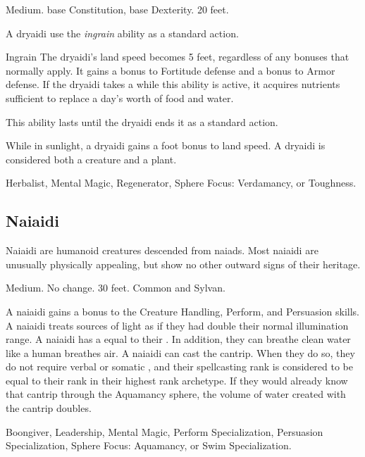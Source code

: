          Medium.
          base Constitution,  base Dexterity.
         20 feet.
        \begin{itemize}
             A dryaidi use the \textit{ingrain} ability as a standard action.
                \begin{freeability}{Ingrain}
                    The dryaidi's land speed becomes 5 feet, regardless of any bonuses that normally apply.
                    It gains a  bonus to Fortitude defense and a  bonus to Armor defense.
                    If the dryaidi takes a  while this ability is active, it acquires nutrients sufficient to replace a day's worth of food and water.

                    This ability lasts until the dryaidi ends it as a standard action.
                \end{freeability}
             While in sunlight, a dryaidi gains a  foot bonus to land speed.
             A dryaidi is considered both a creature and a plant.
        \end{itemize}
         Herbalist, Mental Magic, Regenerator, Sphere Focus: Verdamancy, or Toughness.

    \subsection{Naiaidi}

        Naiaidi are humanoid creatures descended from naiads.
        Most naiaidi are unusually physically appealing, but show no other outward signs of their heritage.

         Medium.
         No change.
         30 feet.
         Common and Sylvan.
        \begin{itemize}
             A naiaidi gains a  bonus to the Creature Handling, Perform, and Persuasion skills.
             A naiaidi treats sources of light as if they had double their normal illumination range.
             A naiaidi has a  equal to their .
                In addition, they can breathe clean water like a human breathes air.
             A naiaidi can cast the  cantrip.
                When they do so, they do not require verbal or somatic , and their spellcasting rank is considered to be equal to their rank in their highest rank archetype.
                If they would already know that cantrip through the Aquamancy sphere, the volume of water created with the cantrip doubles.
        \end{itemize}
         Boongiver, Leadership, Mental Magic, Perform Specialization, Persuasion Specialization, Sphere Focus: Aquamancy, or Swim Specialization.

